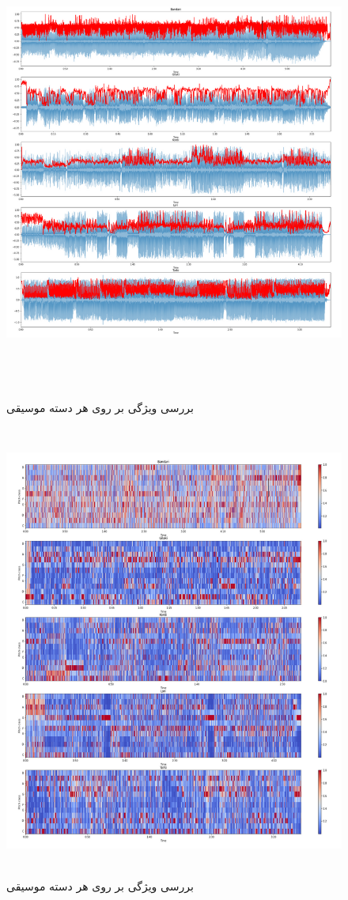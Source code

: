 \documentclass[12pt,onecolumn,a4paper]{article}
\begin{document}
\begin{figure}
  \centering
  \includegraphics[width=20cm,height=15cm,keepaspectratio]{4.png}
  \caption{بررسی ویژگی  بر روی هر دسته موسیقی}
  \label{fig:SpectralRolloff}
\end{figure}

\begin{figure}
  \centering
  \includegraphics[width=20cm,height=15cm,keepaspectratio]{5.png}
  \caption{بررسی ویژگی  بر روی هر دسته موسیقی}
  \label{fig:ChromaFreq}
\end{figure}
\end{document}
